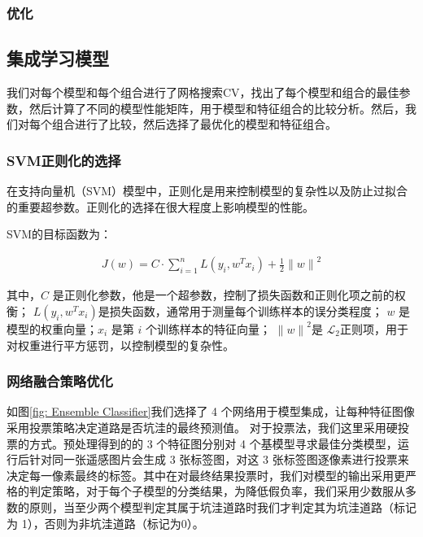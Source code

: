 \documentclass[a4paper, 10pt]{article}
\begin{document}
	\subsubsection{优化}
	
	\subsection{集成学习模型}
	
	我们对每个模型和每个组合进行了网格搜索CV，找出了每个模型和组合的最佳参数，然后计算了不同的模型性能矩阵，用于模型和特征组合的比较分析。然后，我们对每个组合进行了比较，然后选择了最优化的模型和特征组合。
	
	\subsubsection{SVM正则化的选择}
	
	在支持向量机（SVM）模型中，正则化是用来控制模型的复杂性以及防止过拟合的重要超参数。正则化的选择在很大程度上影响模型的性能。
	
	SVM的目标函数为：
	
	\begin{equation}
		\begin{aligned}
			J\left( w \right) = C \cdot \sum_{i=1}^{n} L \left(y_i, w^T x_i\right) + \frac{1}{2} {\| w \|}^2
		\end{aligned}
		\label{eq: svm function}
	\end{equation}
	
	其中，$C$ 是正则化参数，他是一个超参数，控制了损失函数和正则化项之前的权衡；
	$L \left(y_i, w^T x_i\right)$是损失函数，通常用于测量每个训练样本的误分类程度；
	$w$ 是模型的权重向量；$x_i$ 是第 $i$ 个训练样本的特征向量；
	${\| w \|}^2$是 $\mathcal{L}_2$正则项，用于对权重进行平方惩罚，以控制模型的复杂性。
	
	\subsubsection{网络融合策略优化}
	
	如图\ref{fig: Ensemble Classifier}我们选择了 4 个网络用于模型集成，让每种特征图像采用投票策略决定道路是否坑洼的最终预测值。
	对于投票法，我们这里采用硬投票的方式。预处理得到的的 3 个特征图分别对 4 个基模型寻求最佳分类模型，运行后针对同一张遥感图片会生成 3 张标签图，对这 3 张标签图逐像素进行投票来决定每一像素最终的标签。其中在对最终结果投票时，我们对模型的输出采用更严格的判定策略，对于每个子模型的分类结果，为降低假负率，我们采用少数服从多数的原则，当至少两个模型判定其属于坑洼道路时我们才判定其为坑洼道路（标记为 1），否则为非坑洼道路（标记为0）。
	
\end{document}
